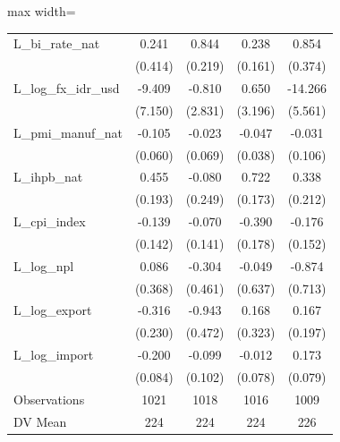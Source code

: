 \begin{table}[H]
\begin{adjustbox}{max width=\textwidth}
\begin{tabular}{l*{4}{c}}
L\_bi\_rate\_nat&       0.241         &       0.844\sym{***}&       0.238         &       0.854\sym{*}  \\
            &     (0.414)         &     (0.219)         &     (0.161)         &     (0.374)         \\
L\_log\_fx\_idr\_usd&      -9.409         &      -0.810         &       0.650         &     -14.266\sym{*}  \\
            &     (7.150)         &     (2.831)         &     (3.196)         &     (5.561)         \\
L\_pmi\_manuf\_nat&      -0.105         &      -0.023         &      -0.047         &      -0.031         \\
            &     (0.060)         &     (0.069)         &     (0.038)         &     (0.106)         \\
L\_ihpb\_nat  &       0.455\sym{*}  &      -0.080         &       0.722\sym{***}&       0.338         \\
            &     (0.193)         &     (0.249)         &     (0.173)         &     (0.212)         \\
L\_cpi\_index &      -0.139         &      -0.070         &      -0.390\sym{*}  &      -0.176         \\
            &     (0.142)         &     (0.141)         &     (0.178)         &     (0.152)         \\
L\_log\_npl   &       0.086         &      -0.304         &      -0.049         &      -0.874         \\
            &     (0.368)         &     (0.461)         &     (0.637)         &     (0.713)         \\
L\_log\_export&      -0.316         &      -0.943\sym{*}  &       0.168         &       0.167         \\
            &     (0.230)         &     (0.472)         &     (0.323)         &     (0.197)         \\
L\_log\_import&      -0.200\sym{*}  &      -0.099         &      -0.012         &       0.173\sym{*}  \\
            &     (0.084)         &     (0.102)         &     (0.078)         &     (0.079)         \\
\midrule
Observations&        1021         &        1018         &        1016         &        1009         \\
DV Mean     &         224         &         224         &         224         &         226         \\

\end{tabular}
\end{adjustbox}
\end{table}
